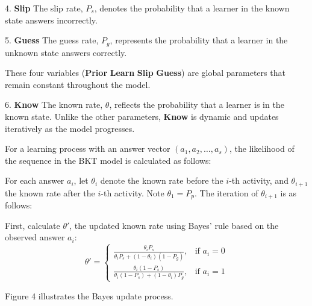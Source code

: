 \documentclass{article}
\begin{document}
4. \textbf{Slip}  
The slip rate, \( P_s \), denotes the probability that a learner in the known state answers incorrectly.

5. \textbf{Guess}  
The guess rate, \( P_g \), represents the probability that a learner in the unknown state answers correctly.

These four variables (\textbf{Prior} \textbf{Learn} \textbf{Slip} \textbf{Guess}) are global parameters that remain constant throughout the model.

6. \textbf{Know}  
The known rate, \( \theta \), reflects the probability that a learner is in the known state. Unlike the other parameters, \textbf{Know} is dynamic and updates iteratively as the model progresses.

For a learning process with an answer vector \( (a_1, a_2, \dots, a_s) \), the likelihood of the sequence in the BKT model is calculated as follows:

For each answer \( a_i \), let \(\theta_{i}\) denote the known rate before the \(i\)-th activity, and \(\theta_{i+1}\) the known rate after the \(i\)-th activity. Note \(\theta_1 = P_p\). The iteration of \(\theta_{i+1}\) is as follows:

First, calculate \(\theta'\), the updated known rate using Bayes' rule based on the observed answer \( a_i \):
\[
\theta' = 
\begin{cases} 
    \frac{\theta_{i} P_s}{\theta_{i} P_s + (1 - \theta_{i}) (1 - P_g)}, & \text{if } a_i = 0 \\[10pt]
    \frac{\theta_{i} (1 - P_s)}{\theta_{i} (1 - P_s) + (1 - \theta_{i}) P_g}, & \text{if } a_i = 1 
\end{cases}
\]

Figure 4 illustrates the Bayes update process.

\begin{center}
\end{center}
\end{document}
